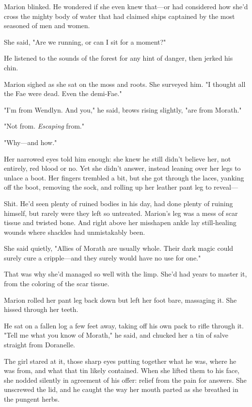 Marion blinked. He wondered if she even knew that---or had considered how she'd cross the mighty body of water that had claimed ships captained by the most seasoned of men and women.

She said, "Are we running, or can I sit for a moment?"

He listened to the sounds of the forest for any hint of danger, then jerked his chin.

Marion sighed as she sat on the moss and roots. She surveyed him. "I thought all the Fae were dead. Even the demi-Fae."

"I'm from Wendlyn. And you," he said, brows rising slightly, "are from Morath."

"Not from. \emph{Escaping} from."

"Why---and how."

Her narrowed eyes told him enough: she knew he still didn't believe her, not entirely, red blood or no. Yet she didn't answer, instead leaning over her legs to unlace a boot. Her fingers trembled a bit, but she got through the laces, yanking off the boot, removing the sock, and rolling up her leather pant leg to reveal---

Shit. He'd seen plenty of ruined bodies in his day, had done plenty of ruining himself, but rarely were they left so untreated. Marion's leg was a mess of scar tissue and twisted bone. And right above her misshapen ankle lay still-healing wounds where shackles had unmistakably been.

She said quietly, "Allies of Morath are usually whole. Their dark magic could surely cure a cripple---and they surely would have no use for one."

That was why she'd managed so well with the limp. She'd had years to master it, from the coloring of the scar tissue.

Marion rolled her pant leg back down but left her foot bare, massaging it. She hissed through her teeth.

He sat on a fallen log a few feet away, taking off his own pack to rifle through it. "Tell me what you know of Morath," he said, and chucked her a tin of salve straight from Doranelle.

The girl stared at it, those sharp eyes putting together what he was, where he was from, and what that tin likely contained. When she lifted them to his face, she nodded silently in agreement of his offer: relief from the pain for answers. She unscrewed the lid, and he caught the way her mouth parted as she breathed in the pungent herbs.

